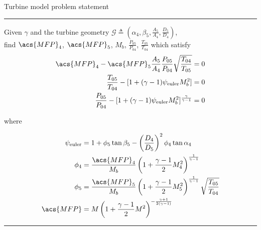 \documentclass[tcc]{subfiles}
\begin{document}
\begin{table}
\centering
\caption{Turbine model problem statement}
\label{map:turbine}
\begin{minipage}{0.7\textwidth}
    \hrule

    Given $\gamma$ and the turbine geometry 
    $\mathcal{G} \triangleq \left(
    \alpha_4, \beta_5, \tfrac{A_5}{A_4}, \tfrac{D_{5}}{D_4} \right)$, \\
    find $\acs{MFP}_4$, $\acs{MFP}_5$, $M_b$, $\frac{P_{05}}{P_{04}}$, $\frac{T_{05}}{T_{04}}$ 
    which satisfy
\begin{align}
    \acs{MFP}_4 - \acs{MFP}_5\frac{A_5}{A_4}\frac{P_{05}}{P_{04}}\sqrt{\frac{T_{04}}{T_{05}}}    &= 0 \\
    \frac{T_{05}}{T_{04}} - [1 + (\gamma-1)\psi_{\text{euler}} M_b^2]                           &= 0 \\
    \frac{P_{05}}{P_{04}} - [1 + (\gamma-1)\psi_{\text{euler}} M_b^2]^{\frac{\gamma}{\gamma-1}} &= 0 \label{eqn:turb_res_pr}
\end{align}

where

\begin{align}
    \psi_{\text{euler}} & = 1 + \phi_5\tan\beta_5-\left(\frac{D_4}{D_5}\right)^2\phi_4\tan\alpha_4 \\
    \phi_4 &= \frac{\acs{MFP}_4}{M_b} \left( 1 + \frac{\gamma-1}{2} M_4^2 \right)^{\frac{1}{\gamma-1}} \\
    \phi_5 &= \frac{\acs{MFP}_5}{M_b} \left( 1 + \frac{\gamma-1}{2} M_5^2 \right)^{\frac{1}{\gamma-1}} \sqrt{\frac{T_{05}}{T_{04}}}\\
    \acs{MFP} &= M \left( 1 + \frac{\gamma-1}{2} M^2 \right)^{-\frac{\gamma+1}{2(\gamma-1)}}
\end{align}

    \hrule
\end{minipage}
\end{table}
\end{document}
